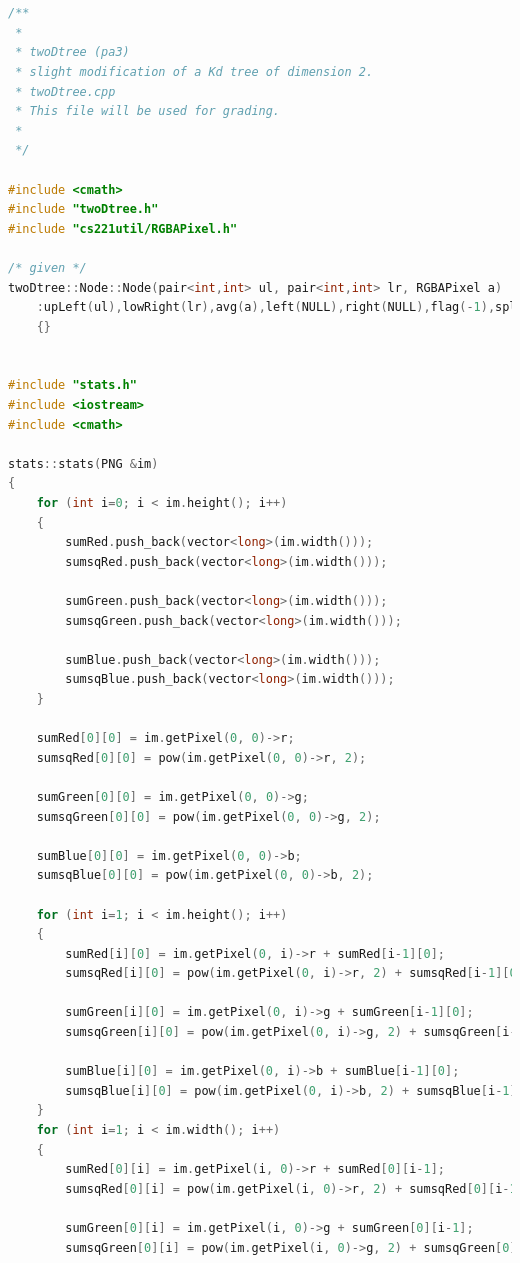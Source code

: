 \documentclass[UTF8]{ctexart}
\begin{document}
\begin{lstlisting}[language=C++,caption={twoDTree.cpp},label={twoDTree.cpp}]


/**
 *
 * twoDtree (pa3)
 * slight modification of a Kd tree of dimension 2.
 * twoDtree.cpp
 * This file will be used for grading.
 *
 */

#include <cmath>
#include "twoDtree.h"
#include "cs221util/RGBAPixel.h"

/* given */
twoDtree::Node::Node(pair<int,int> ul, pair<int,int> lr, RGBAPixel a)
	:upLeft(ul),lowRight(lr),avg(a),left(NULL),right(NULL),flag(-1),split_value(-1)
	{}


#include "stats.h"
#include <iostream>
#include <cmath>

stats::stats(PNG &im)
{
    for (int i=0; i < im.height(); i++)
    {
        sumRed.push_back(vector<long>(im.width()));
        sumsqRed.push_back(vector<long>(im.width()));

        sumGreen.push_back(vector<long>(im.width()));
        sumsqGreen.push_back(vector<long>(im.width()));

        sumBlue.push_back(vector<long>(im.width()));
        sumsqBlue.push_back(vector<long>(im.width()));
    }
    
    sumRed[0][0] = im.getPixel(0, 0)->r;
    sumsqRed[0][0] = pow(im.getPixel(0, 0)->r, 2);
    
    sumGreen[0][0] = im.getPixel(0, 0)->g;
    sumsqGreen[0][0] = pow(im.getPixel(0, 0)->g, 2);
    
    sumBlue[0][0] = im.getPixel(0, 0)->b;
    sumsqBlue[0][0] = pow(im.getPixel(0, 0)->b, 2);

    for (int i=1; i < im.height(); i++)
    {
        sumRed[i][0] = im.getPixel(0, i)->r + sumRed[i-1][0];
        sumsqRed[i][0] = pow(im.getPixel(0, i)->r, 2) + sumsqRed[i-1][0];

        sumGreen[i][0] = im.getPixel(0, i)->g + sumGreen[i-1][0];
        sumsqGreen[i][0] = pow(im.getPixel(0, i)->g, 2) + sumsqGreen[i-1][0];

        sumBlue[i][0] = im.getPixel(0, i)->b + sumBlue[i-1][0];
        sumsqBlue[i][0] = pow(im.getPixel(0, i)->b, 2) + sumsqBlue[i-1][0];
    }
    for (int i=1; i < im.width(); i++)
    {
        sumRed[0][i] = im.getPixel(i, 0)->r + sumRed[0][i-1];
        sumsqRed[0][i] = pow(im.getPixel(i, 0)->r, 2) + sumsqRed[0][i-1];

        sumGreen[0][i] = im.getPixel(i, 0)->g + sumGreen[0][i-1];
        sumsqGreen[0][i] = pow(im.getPixel(i, 0)->g, 2) + sumsqGreen[0][i-1];


\end{lstlisting}
\end{document}

